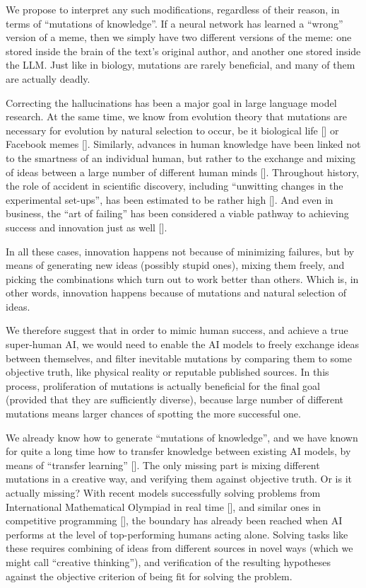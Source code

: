 \documentclass[12pt]{article}
\newcommand{\citestrut}[1]{\vphantom{[}{#1}\vphantom{]}}
\renewcommand{\cite}[1]{[\hyperlink{#1}{\citestrut{#1}}]}
\begin{document}
We propose to interpret any such modifications, regardless of their reason, in terms of
``mutations of knowledge''. If a neural network has learned a ``wrong'' version of a
meme, then we simply have two different versions of the meme: one stored inside the brain
of the text's original author, and another one stored inside the LLM. Just like in
biology, mutations are rarely beneficial, and many of them are actually deadly.

Correcting the hallucinations has been a major goal in large language model research. At
the same time, we know from evolution theory that mutations are necessary for evolution
by natural selection to occur, be it biological life \cite{SelfishGene} or Facebook memes
\cite{FacebookMemes}. Similarly, advances in human knowledge have been linked not to the
smartness of an individual human, but rather to the exchange and mixing of ideas between
a large number of different human minds \cite{CollectiveIntelligence}. Throughout
history, the role of accident in scientific discovery, including ``unwitting changes in
the experimental set-ups'', has been estimated to be rather high \cite{Serendipity}. And
even in business, the ``art of failing'' has been considered a viable pathway to
achieving success and innovation just as well \cite{IntelligentFailure}.

In all these cases, innovation happens not because of minimizing failures, but by means
of generating new ideas (possibly stupid ones), mixing them freely, and picking the
combinations which turn out to work better than others. Which is, in other words,
innovation happens because of mutations and natural selection of ideas.

We therefore suggest that in order to mimic human success, and achieve a true super-human
AI, we would need to enable the AI models to freely exchange ideas between themselves,
and filter inevitable mutations by comparing them to some objective truth, like physical
reality or reputable published sources. In this process, proliferation of mutations is
actually beneficial for the final goal (provided that they are sufficiently diverse),
because large number of different mutations means larger chances of spotting the more
successful one.

We already know how to generate ``mutations of knowledge'', and we have known for quite a
long time how to transfer knowledge between existing AI models, by means of ``transfer
learning'' \cite{TransferLearning}. The only missing part is mixing different mutations
in a creative way, and verifying them against objective truth. Or is it actually missing?
With recent models successfully solving problems from International Mathematical Olympiad
in real time \cite{IMO}, and similar ones in competitive programming \cite{ICPC}, the
boundary has already been reached when AI performs at the level of top-performing humans
acting alone. Solving tasks like these requires combining of ideas from different sources
in novel ways (which we might call ``creative thinking''), and verification of the
resulting hypotheses against the objective criterion of being fit for solving the
problem.
\end{document}
